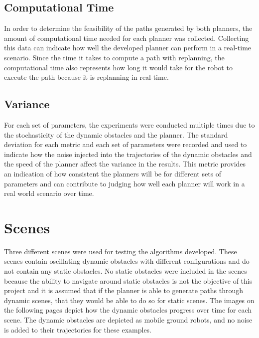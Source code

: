 \subsection{Computational Time}

In order to determine the feasibility of the paths generated by both planners,
the amount of computational time needed for each planner was collected.
Collecting this data can indicate how well the developed planner can perform in
a real-time scenario. Since the time it takes to compute a path with
replanning, the computational time also represents how long it would take for
the robot to execute the path because it is replanning in real-time.

\subsection{Variance}

For each set of parameters, the experiments were conducted multiple times due
to the stochasticity of the dynamic obstacles and the planner. The standard
deviation for each metric and each set of parameters were recorded and used to
indicate how the noise injected into the trajectories of the dynamic obstacles
and the speed of the planner affect the variance in the results. This metric
provides an indication of how consistent the planners will be for different
sets of parameters and can contribute to judging how well each planner will
work in a real world scenario over time.

\section{Scenes}

Three different scenes were used for testing the algorithms developed. These
scenes contain oscillating dynamic obstacles with different configurations and
do not contain any static obstacles. No static obstacles were included in the
scenes because the ability to navigate around static obstacles is not the
objective of this project and it is assumed that if the planner is able to
generate paths through dynamic scenes, that they would be able to do so for
static scenes. The images on the following pages depict how the dynamic
obstacles progress over time for each scene. The dynamic obstacles are depicted
as mobile ground robots, and no noise is added to their trajectories for these
examples.

